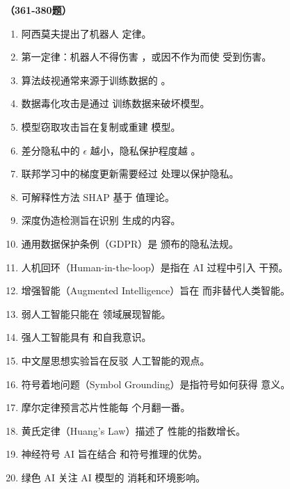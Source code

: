 \vspace{1em}
\textbf{（361-380题）}
\begin{enumerate}[resume,leftmargin=2em,itemsep=1pt]
\item 阿西莫夫提出了机器人 \underline{\hspace{3em}} 定律。
\item 第一定律：机器人不得伤害 \underline{\hspace{3em}}，或因不作为而使 \underline{\hspace{3em}} 受到伤害。
\item 算法歧视通常来源于训练数据的 \underline{\hspace{3em}}。
\item 数据毒化攻击是通过 \underline{\hspace{3em}} 训练数据来破坏模型。
\item 模型窃取攻击旨在复制或重建 \underline{\hspace{3em}} 模型。
\item 差分隐私中的 $\epsilon$ 越小，隐私保护程度越 \underline{\hspace{3em}}。
\item 联邦学习中的梯度更新需要经过 \underline{\hspace{3em}} 处理以保护隐私。
\item 可解释性方法 SHAP 基于 \underline{\hspace{3em}} 值理论。
\item 深度伪造检测旨在识别 \underline{\hspace{3em}} 生成的内容。
\item 通用数据保护条例（GDPR）是 \underline{\hspace{3em}} 颁布的隐私法规。
\item 人机回环（Human-in-the-loop）是指在 AI 过程中引入 \underline{\hspace{3em}} 干预。
\item 增强智能（Augmented Intelligence）旨在 \underline{\hspace{3em}} 而非替代人类智能。
\item 弱人工智能只能在 \underline{\hspace{3em}} 领域展现智能。
\item 强人工智能具有 \underline{\hspace{3em}} 和自我意识。
\item 中文屋思想实验旨在反驳 \underline{\hspace{3em}} 人工智能的观点。
\item 符号着地问题（Symbol Grounding）是指符号如何获得 \underline{\hspace{3em}} 意义。
\item 摩尔定律预言芯片性能每 \underline{\hspace{3em}} 个月翻一番。
\item 黄氏定律（Huang's Law）描述了 \underline{\hspace{3em}} 性能的指数增长。
\item 神经符号 AI 旨在结合 \underline{\hspace{3em}} 和符号推理的优势。
\item 绿色 AI 关注 AI 模型的 \underline{\hspace{3em}} 消耗和环境影响。
\end{enumerate}

